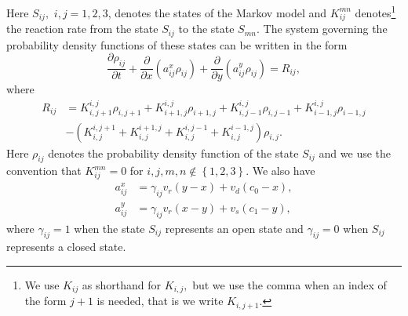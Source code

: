 Here $S_{ij},$ $i,j=1,2,3$, denotes the states of the Markov model and
$K_{ij}^{mn}$ denotes\footnote{We use $K_{ij}$ as shorthand for $K_{i,j},$ but
we use the comma when an index of the form $j+1$ is needed, that is we write
$K_{i,j+1}.$} the reaction rate from the state $S_{ij}$ to the state $S_{mn}.$
The system governing the probability density functions of these states can be
written in the form%
\begin{equation}
\frac{\partial\rho_{ij}}{\partial t}+\frac{\partial}{\partial x}\left(
a_{ij}^{x}\rho_{ij}\right)  +\frac{\partial}{\partial y}\left(  a_{ij}^{y}%
\rho_{ij}\right)  =R_{ij},\label{pdf99}%
\end{equation}
where%
\begin{align*}
R_{ij}  & =K_{i,j+1}^{i,j}\rho_{i,j+1}+K_{i+1,j}^{i,j}\rho_{i+1,j}%
+K_{i,j-1}^{i,j}\rho_{i,j-1}+K_{i-1,j}^{i,j}\rho_{i-1,j}\\
& -\left(  K_{i,j}^{i,j+1}+K_{i,j}^{i+1,j}+K_{i,j}^{i,j-1}+K_{i,j}%
^{i-1,j}\right)  \rho_{i,j}.
\end{align*}
Here $\rho_{ij}$ denotes the probability density function of the state
$S_{ij}$ and we use the convention that $K_{ij}^{mn}=0$ for $i,j,m,n\notin%
\left\{  1,2,3\right\}  .$ We also have%
\begin{align*}
a_{ij}^{x} &  =\gamma_{ij}v_{r}\left(  y-x\right)  +v_{d}\left(
c_{0}-x\right)  ,\\
a_{ij}^{y} &  =\gamma_{ij}v_{r}\left(  x-y\right)  +v_{s}\left(
c_{1}-y\right)  ,
\end{align*}
where $\gamma_{ij}=1$ when the state $S_{ij}$ represents an open state and
$\gamma_{ij}=0$ when $S_{ij}$ represents a closed state.




